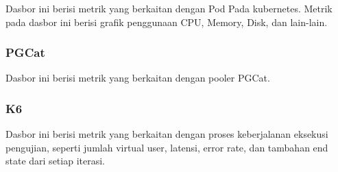 Dasbor ini berisi metrik yang berkaitan dengan Pod Pada kubernetes. Metrik pada dasbor ini berisi grafik penggunaan CPU, Memory, Disk, dan lain-lain.

\subsubsection{PGCat}

Dasbor ini berisi metrik yang berkaitan dengan pooler PGCat.

\subsubsection{K6}

Dasbor ini berisi metrik yang berkaitan dengan proses keberjalanan eksekusi pengujian, seperti jumlah virtual user, latensi, error rate, dan tambahan end state dari setiap iterasi.